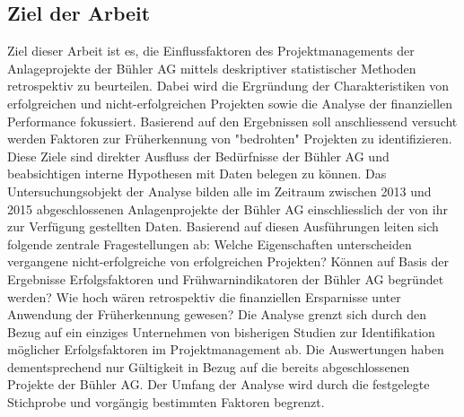 \subsection{Ziel der Arbeit}
Ziel dieser Arbeit ist es, die Einflussfaktoren des Projektmanagements der Anlageprojekte der Bühler AG mittels deskriptiver statistischer Methoden retrospektiv zu beurteilen. Dabei wird die Ergründung der Charakteristiken von erfolgreichen und nicht-erfolgreichen Projekten sowie die Analyse der finanziellen Performance fokussiert. Basierend auf den Ergebnissen soll anschliessend versucht werden Faktoren zur Früherkennung von "bedrohten" Projekten zu identifizieren. Diese Ziele sind direkter Ausfluss der Bedürfnisse der Bühler AG und beabsichtigen interne Hypothesen mit Daten belegen zu können. Das Untersuchungsobjekt der Analyse bilden alle im Zeitraum zwischen 2013 und 2015 abgeschlossenen Anlagenprojekte der Bühler AG einschliesslich der von ihr zur Verfügung gestellten Daten. Basierend auf diesen Ausführungen leiten sich folgende zentrale Fragestellungen ab:
\newline\newline
Welche Eigenschaften unterscheiden vergangene nicht-erfolgreiche von erfolgreichen Projekten? Können auf Basis der Ergebnisse Erfolgsfaktoren und Frühwarnindikatoren der Bühler AG begründet werden? Wie hoch wären retrospektiv die finanziellen Ersparnisse unter Anwendung der Früherkennung gewesen?
\newline\newline
Die Analyse grenzt sich durch den Bezug auf ein einziges Unternehmen von bisherigen Studien zur Identifikation möglicher Erfolgsfaktoren im Projektmanagement ab. Die Auswertungen haben dementsprechend nur Gültigkeit in Bezug auf die bereits abgeschlossenen Projekte der Bühler AG. Der Umfang der Analyse wird durch die festgelegte Stichprobe und vorgängig bestimmten Faktoren begrenzt.
